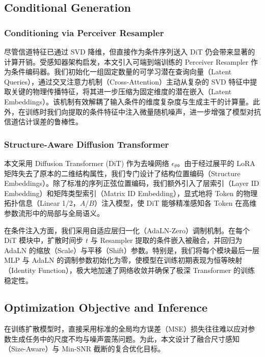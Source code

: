 \documentclass[12pt,a4paper]{article}
\begin{document}
\subsection{Conditional Generation}
\label{subsec:architecture}

\subsubsection*{Conditioning via Perceiver Resampler}
尽管信道特征已通过 SVD 降维，但直接作为条件序列送入 DiT 仍会带来显著的计算开销。受感知器架构启发，本文引入可端到端训练的 Perceiver Resampler 作为条件编码器。我们初始化一组固定数量的可学习潜在查询向量（Latent Queries），通过交叉注意力机制（Cross-Attention）主动从复杂的 SVD 特征中提取关键的物理传播特征，将其进一步压缩为固定维度的潜在嵌入（Latent Embeddings）。该机制有效解耦了输入条件的维度复杂度与生成主干的计算量。此外，在训练时我们向提取的条件特征中注入微量随机噪声，进一步增强了模型对抗信道估计误差的鲁棒性。
 
\subsubsection*{Structure-Aware Diffusion Transformer}
本文采用 Diffusion Transformer (DiT) 作为去噪网络 $\epsilon_\theta$。由于经过展平的 LoRA 矩阵失去了原本的二维结构属性，我们专门设计了结构位置编码（Structure Embeddings）。除了标准的序列正弦位置编码，我们额外引入了层索引（Layer ID Embedding）和矩阵类型索引（Matrix ID Embedding），显式地将 Token 的物理拓扑信息（Linear 1/2，$A$/$B$）注入模型，使 DiT 能够精准感知各 Token 在高维参数流形中的局部与全局语义。

在条件注入方面，我们采用自适应层归一化（AdaLN-Zero）调制机制。在每个 DiT 模块中，扩散时间步 $t$ 与 Resampler 提取的条件嵌入被融合，并回归为 AdaLN 的缩放（Scale）与平移（Shift）参数。特别是，我们将每个模块最后一层 MLP 与 AdaLN 的调制参数初始化为零，使模型在训练初期表现为恒等映射（Identity Function），极大地加速了网络收敛并确保了极深 Transformer 的训练稳定性。

\subsection{Optimization Objective and Inference}
\label{subsec:optimization}
在训练扩散模型时，直接采用标准的全局均方误差（MSE）损失往往难以应对参数生成任务中的尺度不均与噪声震荡问题。为此，本文设计了融合尺寸感知（Size-Aware）与 Min-SNR 截断的复合优化目标。
\end{document}
